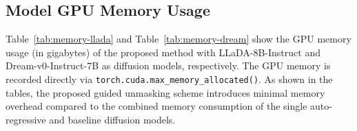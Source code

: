\subsection{Model GPU Memory Usage}\label{sec:memory}

Table~\ref{tab:memory-llada} and Table~\ref{tab:memory-dream} show the GPU memory usage (in gigabytes) of the proposed method with LLaDA-8B-Instruct and Dream-v0-Instruct-7B as diffusion models, respectively.
The GPU memory is recorded directly via \texttt{torch.cuda.max\_memory\_allocated()}. As shown in the tables, the proposed guided unmasking scheme introduces minimal memory overhead compared to the combined memory consumption of the single auto-regressive and baseline diffusion models. 


